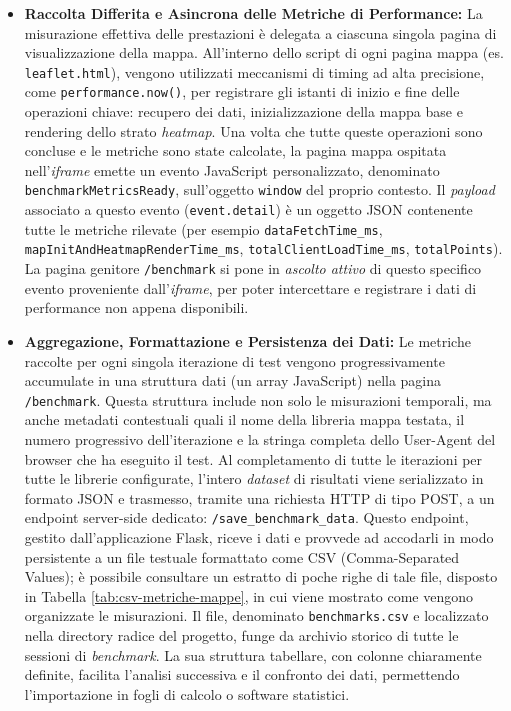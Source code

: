 \begin{itemize}[leftmargin=*]
  \item \textbf{Raccolta Differita e Asincrona delle Metriche di Performance:}
    La misurazione effettiva delle prestazioni è delegata a ciascuna singola
    pagina di visualizzazione della mappa. All'interno dello script di ogni pagina
    mappa (es. \texttt{leaflet.html}), vengono utilizzati meccanismi di timing
    ad alta precisione, come \texttt{performance.now()}, per registrare gli istanti
    di inizio e fine delle operazioni chiave: recupero dei dati, inizializzazione
    della mappa base e rendering dello strato \textit{heatmap}. Una volta che tutte
    queste operazioni sono concluse e le metriche sono state calcolate, la
    pagina mappa ospitata nell'\textit{iframe} emette un evento JavaScript personalizzato,
    denominato \texttt{benchmarkMetricsReady}, sull'oggetto \texttt{window} del proprio
    contesto. Il \textit{payload} associato a questo evento (\texttt{event.detail})
    è un oggetto JSON contenente tutte le metriche rilevate (per esempio \texttt{dataFetchTime\_ms},
    \texttt{mapInitAndHeatmapRenderTime\_ms}, \texttt{totalClientLoadTime\_ms}, \texttt{totalPoints}).
    La pagina genitore \texttt{/benchmark} si pone in \textit{ascolto attivo} di
    questo specifico evento proveniente dall'\textit{iframe}, per poter
    intercettare e registrare i dati di performance non appena disponibili.

  \item \textbf{Aggregazione, Formattazione e Persistenza dei Dati:} Le metriche
    raccolte per ogni singola iterazione di test vengono progressivamente
    accumulate in una struttura dati (un array JavaScript) nella pagina \texttt{/benchmark}.
    Questa struttura include non solo le misurazioni temporali, ma anche metadati
    contestuali quali il nome della libreria mappa testata, il numero
    progressivo dell'iterazione e la stringa completa dello User-Agent del
    browser che ha eseguito il test. Al completamento di tutte le iterazioni per
    tutte le librerie configurate, l'intero \textit{dataset} di risultati viene serializzato
    in formato JSON e trasmesso, tramite una richiesta HTTP di tipo POST, a un endpoint
    server-side dedicato: \texttt{/save\_benchmark\_data}. Questo endpoint, gestito
    dall'applicazione Flask, riceve i dati e provvede ad accodarli in modo
    persistente a un file testuale formattato come CSV (Comma-Separated Values);
    è possibile consultare un estratto di poche righe di tale file, disposto in
    Tabella \ref{tab:csv-metriche-mappe}, in cui viene mostrato come vengono organizzate
    le misurazioni. Il file, denominato \texttt{benchmarks.csv} e localizzato
    nella directory radice del progetto, funge da archivio storico di tutte le sessioni
    di \textit{benchmark}. La sua struttura tabellare, con colonne chiaramente
    definite, facilita l'analisi successiva e il confronto dei dati, permettendo
    l'importazione in fogli di calcolo o software statistici.
\end{itemize}


